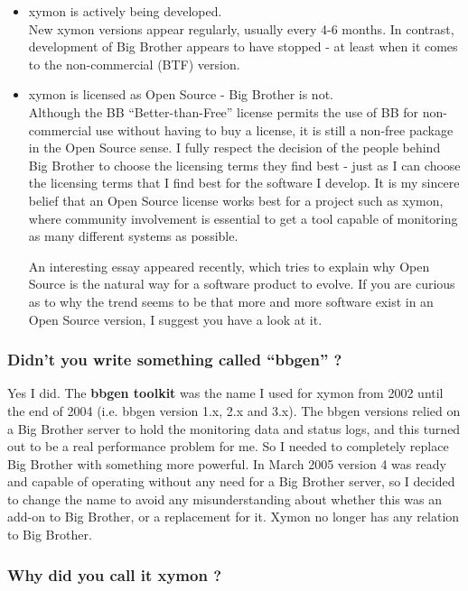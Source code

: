 \begin{itemize}
\item xymon is actively being developed.\\ 


 New xymon versions appear regularly, usually every 4-6 months. In contrast, development of Big Brother appears to have stopped - at least when it comes to the non-commercial (BTF) version.

\item xymon is licensed as Open Source - Big Brother is not.\\ 


 Although the BB ``Better-than-Free'' license permits the use of BB for non-commercial use without having to buy a license, it is still a non-free package in the Open Source sense. I fully respect the decision of the people behind Big Brother to choose the licensing terms they find best - just as I can choose the licensing terms that I find best for the software I develop. It is my sincere belief that an Open Source license works best for a project such as xymon, where community involvement is essential to get a tool capable of monitoring as many different systems as possible.


 An interesting essay appeared recently, which tries to explain why Open Source is the natural way for a software product to evolve. If you are curious as to why the trend seems to be that more and more software exist in an Open Source version, I suggest you have a look at it.


\end{itemize}
\subsubsection{Didn't you write something called ``bbgen'' ?}


 Yes I did. The \textbf{bbgen toolkit}
 was the name I used for xymon from 2002 until the end of 2004 (i.e. bbgen version 1.x, 2.x and 3.x). The bbgen versions relied on a Big Brother server to hold the monitoring data and status logs, and this turned out to be a real performance problem for me. So I needed to completely replace Big Brother with something more powerful. In March 2005 version 4 was ready and capable of operating without any need for a Big Brother server, so I decided to change the name to avoid any misunderstanding about whether this was an add-on to Big Brother, or a replacement for it. Xymon no longer has any relation to Big Brother.
\subsubsection{Why did you call it xymon ?}


